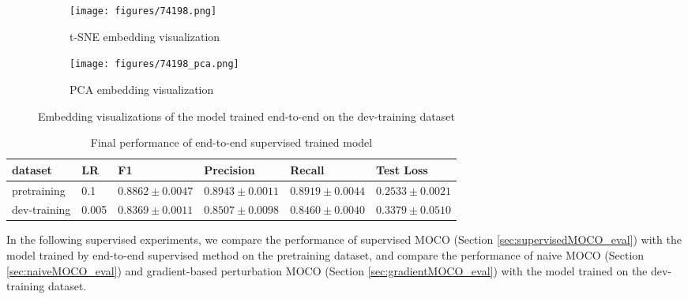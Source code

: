 \documentclass[12pt,twoside]{report}
\begin{document}
\begin{figure}
\centering
    \begin{subfigure}{.45\textwidth}
      \centering
      \texttt{[image: figures/74198.png]}
      \caption{t-SNE embedding visualization}
      \label{fig:small_supervised_tsne}
    \end{subfigure}%
    \begin{subfigure}{.45\textwidth}
      \centering
      \texttt{[image: figures/74198\_pca.png]}
      \caption{PCA embedding visualization}
      \label{fig:small_supervised_pca}
    \end{subfigure}
    \caption{Embedding visualizations of the model trained end-to-end on the dev-training dataset}
    \label{fig:small_supervised_embedding}
\end{figure}



\begin{table}[]
    \centering
    \begin{tabular}{llllll}
    \toprule
    dataset & LR & F1 & Precision & Recall & Test Loss \\
    \midrule
    pretraining & 0.1 & $0.8862 \pm 0.0047$ & $0.8943 \pm 0.0011$ & $0.8919 \pm 0.0044$ & $0.2533 \pm 0.0021$ \\
    dev-training & 0.005 & $0.8369 \pm 0.0011$ & $0.8507 \pm 0.0098$ & $0.8460 \pm 0.0040$ & $0.3379 \pm 0.0510$ \\
    \bottomrule
    \end{tabular}
    \caption{Final performance of end-to-end supervised trained model}
    \label{tab:naive_supervised_final}
\end{table}


In the following supervised experiments, we compare the performance of supervised MOCO (Section \ref{sec:supervisedMOCO_eval}) with the model trained by end-to-end supervised method on the pretraining dataset, and compare the performance of naive MOCO (Section \ref{sec:naiveMOCO_eval}) and gradient-based perturbation MOCO (Section \ref{sec:gradientMOCO_eval}) with the model trained on the dev-training dataset. 
\end{document}
